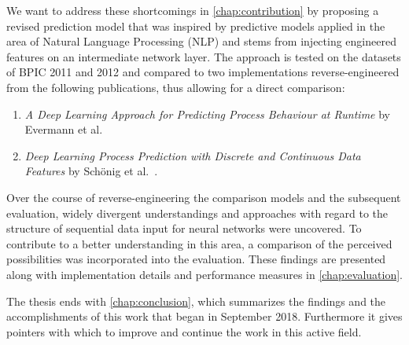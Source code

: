 We want to address these shortcomings in \autoref{chap:contribution} by proposing a revised prediction model that was inspired by predictive models applied in the area of Natural Language Processing (NLP) and stems from injecting engineered features on an intermediate network layer. The approach is tested on the datasets of BPIC 2011 and 2012 and compared to two implementations reverse-engineered from the following publications, thus allowing for a direct comparison:

\begin{enumerate}
    \item \textit{A Deep Learning Approach for Predicting Process Behaviour at Runtime} by Evermann et al.~\cite{evermann2016} \item\textit{Deep Learning Process Prediction with Discrete and Continuous Data Features} by Schönig et al.~\cite{schoenig2018}.
\end{enumerate}

Over the course of reverse-engineering the comparison models and the subsequent evaluation, widely divergent understandings and approaches with regard to the structure of sequential data input for neural networks were uncovered. To contribute to a better understanding in this area, a comparison of the perceived possibilities was incorporated into the evaluation. These findings are presented along with implementation details and performance measures in \autoref{chap:evaluation}.

The thesis ends with \autoref{chap:conclusion}, which summarizes the findings and the accomplishments of this work that began in September 2018. Furthermore it gives pointers with which to improve and continue the work in this active field.